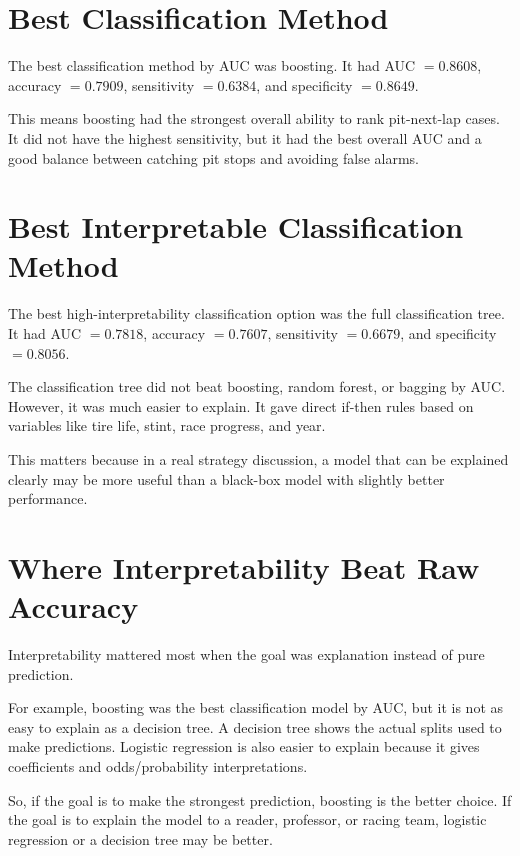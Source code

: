 \documentclass[11pt,oneside,openany]{book}
\begin{document}
\section{Best Classification Method}

The best classification method by AUC was boosting. It had AUC \(=0.8608\), accuracy \(=0.7909\), sensitivity \(=0.6384\), and specificity \(=0.8649\).

This means boosting had the strongest overall ability to rank pit-next-lap cases. It did not have the highest sensitivity, but it had the best overall AUC and a good balance between catching pit stops and avoiding false alarms.

\section{Best Interpretable Classification Method}

The best high-interpretability classification option was the full classification tree. It had AUC \(=0.7818\), accuracy \(=0.7607\), sensitivity \(=0.6679\), and specificity \(=0.8056\).

The classification tree did not beat boosting, random forest, or bagging by AUC. However, it was much easier to explain. It gave direct if-then rules based on variables like tire life, stint, race progress, and year.

This matters because in a real strategy discussion, a model that can be explained clearly may be more useful than a black-box model with slightly better performance.

\section{Where Interpretability Beat Raw Accuracy}

Interpretability mattered most when the goal was explanation instead of pure prediction.

For example, boosting was the best classification model by AUC, but it is not as easy to explain as a decision tree. A decision tree shows the actual splits used to make predictions. Logistic regression is also easier to explain because it gives coefficients and odds/probability interpretations.

So, if the goal is to make the strongest prediction, boosting is the better choice. If the goal is to explain the model to a reader, professor, or racing team, logistic regression or a decision tree may be better.
\end{document}
